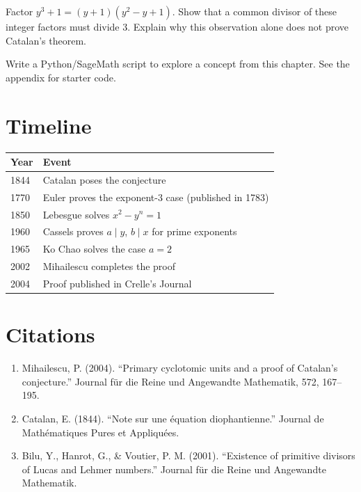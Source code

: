 \begin{exercise}
Factor $y^3+1=(y+1)(y^2-y+1)$. Show that a common divisor of these integer factors must divide 3. Explain why this observation alone does not prove Catalan's theorem.
\end{exercise}


\begin{exercise}[Computational]
Write a Python/SageMath script to explore a concept from this chapter. See the appendix for starter code.
\end{exercise}

\section{Timeline}

\begin{tabularx}{\linewidth}{lX}
\toprule
\textbf{Year} & \textbf{Event} \\ \midrule
1844 & Catalan poses the conjecture \\ 
1770 & Euler proves the exponent-3 case (published in 1783) \\
1850 & Lebesgue solves $x^2 - y^n = 1$ \\ 
1960 & Cassels proves $a \mid y$, $b \mid x$ for prime exponents \\ 
1965 & Ko Chao solves the case $a = 2$ \\ 
2002 & Mihailescu completes the proof \\ 
2004 & Proof published in Crelle's Journal \\ \bottomrule
\end{tabularx}

\section{Citations}

\begin{enumerate}
\item Mihailescu, P. (2004). ``Primary cyclotomic units and a proof of Catalan's conjecture.'' Journal f\"ur die Reine und Angewandte Mathematik, 572, 167--195.
\item Catalan, E. (1844). ``Note sur une \'equation diophantienne.'' Journal de Math\'ematiques Pures et Appliqu\'ees.
\item Bilu, Y., Hanrot, G., \& Voutier, P. M. (2001). ``Existence of primitive divisors of Lucas and Lehmer numbers.'' Journal f\"ur die Reine und Angewandte Mathematik.
\end{enumerate}
